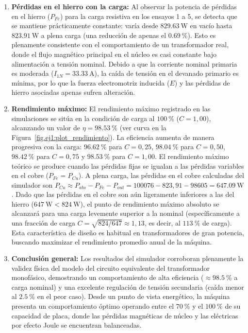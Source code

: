 \begin{enumerate}
    \item \textbf{Pérdidas en el hierro con la carga:}
    Al observar la potencia de pérdidas en el hierro ($P_{Fe}$) para la carga resistiva en los ensayos 1 a 5, se detecta que
    se mantiene prácticamente constante: varía desde $\SI{829,63}{\watt}$ en vacío hasta $\SI{823,91}{\watt}$ a plena carga
    (una reducción de apenas el $\SI{0,69}{\percent}$).
    Esto es plenamente consistente con el comportamiento de un transformador real, donde el flujo magnético principal en
    el núcleo es casi constante bajo alimentación a tensión nominal. Debido a que la corriente nominal primaria es moderada
    ($I_{1N} = \SI{33,33}{\ampere}$), la caída de tensión en el devanado primario es mínima, por lo que la fuerza electromotriz
    inducida ($E$) y las pérdidas de hierro asociadas apenas sufren alteración.

    \item \textbf{Rendimiento máximo:}
    El rendimiento máximo registrado en las simulaciones se sitúa en la condición de carga al $\SI{100}{\percent}$ ($C = 1,00$),
    alcanzando un valor de $\eta = \SI{98,53}{\percent}$ (ver curva en la Figura~\ref{fig.ej1:plot_rendimiento}). La eficiencia aumenta de manera progresiva con la carga:
    $\SI{96,62}{\percent}$ para $C=0,25$, $\SI{98,04}{\percent}$ para $C=0,50$, $\SI{98,42}{\percent}$ para $C=0,75$ y
    $\SI{98,53}{\percent}$ para $C=1,00$.
    El rendimiento máximo teórico se produce cuando las pérdidas fijas se igualan a las pérdidas variables en el cobre
    ($P_{Fe} = P_{Cu}$). A plena carga, las pérdidas en el cobre calculadas del simulador son
    $P_{Cu} \approx P_{abs} - P_{Fe} - P_{out} = 100076 - 823,91 - 98605 = \SI{647,09}{\watt}$. Dado que las pérdidas en el
    cobre son aún ligeramente inferiores a las del hierro ($\SI{647}{\watt} < \SI{824}{\watt}$), el punto de rendimiento
    máximo absoluto se alcanzará para una carga levemente superior a la nominal (específicamente a una fracción de carga
    $C = \sqrt{824/647} \approx 1,13$, es decir, al $\SI{113}{\percent}$ de carga). Esta característica de diseño es habitual
    en transformadores de gran potencia, buscando maximizar el rendimiento promedio anual de la máquina.

    \item \textbf{Conclusión general:}
    Los resultados del simulador corroboran plenamente la validez física del modelo del circuito equivalente del
    transformador monofásico, demostrando un comportamiento de alta eficiencia ($\approx \SI{98,5}{\percent}$ a carga nominal)
    y una excelente regulación de tensión secundaria (caída menor al $\SI{2,5}{\percent}$ en el peor caso). Desde un punto de
    vista energético, la máquina presenta un comportamiento óptimo operando entre el $\SI{70}{\percent}$ y el $\SI{100}{\percent}$
    de su capacidad de placa, donde las pérdidas magnéticas de núcleo y las eléctricas por efecto Joule se encuentran
    balanceadas.
\end{enumerate}

